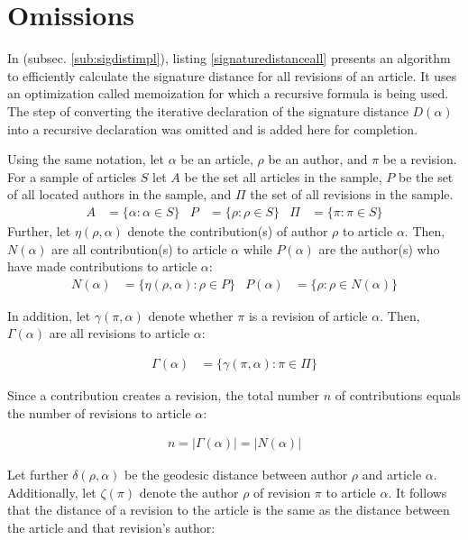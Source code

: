\section{Omissions}

In  (subsec. \ref{sub:sigdistimpl}), listing \ref{signaturedistanceall} presents an algorithm to efficiently calculate the signature distance for all revisions of an article.
It uses an optimization called memoization for which a recursive formula is being used. 
The step of converting the iterative declaration of the signature distance $D(\alpha)$ into a recursive declaration was omitted and is added here for completion.

Using the same notation, let $\alpha$ be an article, $\rho$ be an author, and $\pi$ be a revision.
For a sample of articles $S$ let $A$ be the set all articles in the sample, $P$ be the set of all located authors in the sample, and $\Pi$ the set of all revisions in the sample.
\begin{align*}
A &= \{\alpha : \alpha \in S\} &P &= \{\rho : \rho \in S\} & \Pi &= \{\pi : \pi \in S\}
\end{align*}
Further, let $\eta(\rho,\alpha)$ denote the contribution(s) of author $\rho$ to article $\alpha$.
Then, $N(\alpha)$ are all contribution(s) to article $\alpha$ while $P(\alpha)$ are the author(s) who have made contributions to article $\alpha$:
\begin{align*}
N(\alpha) &= \{\eta(\rho,\alpha) : \rho \in P\} & P(\alpha) &= \{\rho : \rho \in N(\alpha)\}
\end{align*}

In addition, let $\gamma(\pi,\alpha)$ denote whether $\pi$ is a revision of article $\alpha$.
Then, $\Gamma(\alpha)$ are all revisions to article $\alpha$:

\begin{align*}
\Gamma(\alpha) &= \{\gamma(\pi,\alpha) : \pi \in \Pi\}
\end{align*}

Since a contribution creates a revision, the total number $n$ of contributions equals the number of revisions to article $\alpha$:

\begin{align*}
 n = |\Gamma(\alpha)| = |N(\alpha)|
\end{align*}

Let further $\delta(\rho,\alpha)$ be the geodesic distance between author $\rho$ and article $\alpha$.
Additionally, let $\zeta(\pi)$ denote  the author $\rho$ of revision $\pi$ to article $\alpha$.
It follows that the distance of a revision to the article is the same as the distance between the article and that revision's author:

